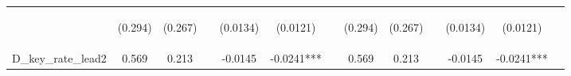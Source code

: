 \documentclass[]{article}
\begin{document}
\begin{center}
\begin{tabular}{lcccccccccccc}
\vspace{4pt} & \begin{footnotesize}(0.294)\end{footnotesize} & \begin{footnotesize}(0.267)\end{footnotesize} & \begin{footnotesize}\end{footnotesize} & \begin{footnotesize}(0.0134)\end{footnotesize} & \begin{footnotesize}(0.0121)\end{footnotesize} & \begin{footnotesize}\end{footnotesize} & \begin{footnotesize}(0.294)\end{footnotesize} & \begin{footnotesize}(0.267)\end{footnotesize} & \begin{footnotesize}\end{footnotesize} & \begin{footnotesize}(0.0134)\end{footnotesize} & \begin{footnotesize}(0.0121)\end{footnotesize} & \begin{footnotesize}\end{footnotesize} \\
D\_key\_rate\_lead2 & 0.569 & 0.213 &  & -0.0145 & -0.0241*** &  & 0.569 & 0.213 &  & -0.0145 & -0.0241*** &  \\

\end{tabular}
\end{center}
\end{document}

